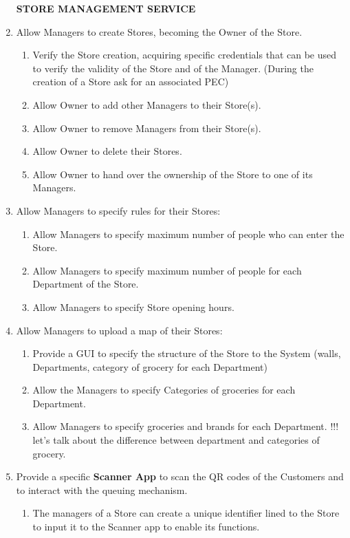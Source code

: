 \documentclass[a4paper, 10pt, oneside]{article}
\newcommand*{\lorenzo}[1]{\textcolor{BurntOrange}{#1}}
\begin{document}
\begin{enumerate}[align=left]
    \item[\textbf{STORE MANAGEMENT SERVICE}]
    \item Allow Managers to create Stores, becoming the Owner of the Store.
    \begin{enumerate}[label={-}]
        \item Verify the Store creation, acquiring specific credentials that can be used to verify the validity of the Store and of the Manager. \lorenzo{(During the creation of a Store ask for an associated PEC)}
        \item Allow Owner to add other Managers to their Store(s).
        \item Allow Owner to remove Managers from their Store(s).
        \item Allow Owner to delete their Stores.
        \item Allow Owner to hand over the ownership of the Store to one of its Managers. 
    \end{enumerate}
    
    \item Allow Managers to specify rules for their Stores:
    \begin{enumerate}[label={-}]
        \item Allow Managers to specify maximum number of people who can enter the Store.
        \item Allow Managers to specify maximum number of people for each Department of the Store.
        \item Allow Managers to specify Store opening hours.
    \end{enumerate}
    
    \item Allow Managers to upload a map of their Stores:
    \begin{enumerate}[label={-}]
        \item Provide a GUI to specify the structure of the Store to the System (walls, Departments, category of grocery for each Department)
        \item Allow the Managers to specify Categories of groceries for each Department.
        \item Allow Managers to specify groceries and brands for each Department. \lorenzo{!!! let's talk about the difference between department and categories of grocery.}
    \end{enumerate}
    
    \item Provide a specific \textbf{Scanner App} to scan the QR codes of the Customers and to interact with the queuing mechanism.
    \begin{enumerate}[label={-}]
        \item The managers of a Store can create a unique identifier lined to the Store to input it to the Scanner app to enable its functions.
    \end{enumerate}
    

\end{enumerate}
\end{document}
